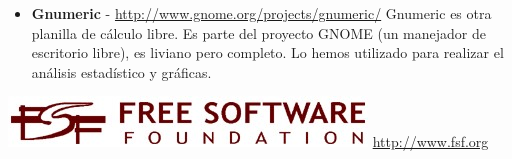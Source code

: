 \begin{flushleft}
\begin{itemize}
\item \textbf{Gnumeric} - \href{http://www.gnome.org/projects/gnumeric/}
  {http://www.gnome.org/projects/gnumeric/}
\linebreak Gnumeric es otra planilla de cálculo libre. Es parte del proyecto
GNOME (un manejador de escritorio libre), es liviano pero completo. Lo hemos
utilizado para realizar el análisis estadístico y gráficas.

\end{itemize}
\end{flushleft}

\begin{center}
\includegraphics[scale=0.50]{hechoconsl/logofsf.jpg}
\linebreak\href{http://www.fsf.org}{http://www.fsf.org}
\end{center}

